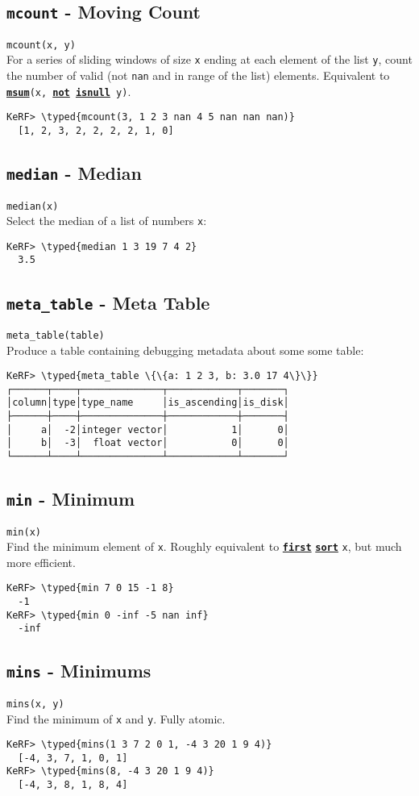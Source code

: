 \documentclass{article}
\newcommand{\typed}[1]{\textcolor{TealBlue}{#1}}
\newcommand{\primdefu}[3]{\subsection{\texttt{#1} - #2}\label{prim:#3}}
\newcommand{\primu}[2]{\hyperref[prim:#2]{\textbf{\texttt{#1}}}}
\newcommand{\primdef}[2]{\primdefu{#1}{#2}{#1}}
\newcommand{\prim}[1]{\primu{#1}{#1}}
\begin{document}
\primdef{mcount}{Moving Count}
\texttt{mcount(x, y)}\\

For a series of sliding windows of size \texttt{x} ending at each element of the list \texttt{y}, count the number of valid (not \texttt{nan} and in range of the list) elements. Equivalent to \texttt{\prim{msum}(x, \prim{not} \prim{isnull} y)}.
\begin{Verbatim}
KeRF> \typed{mcount(3, 1 2 3 nan 4 5 nan nan nan)}
  [1, 2, 3, 2, 2, 2, 2, 1, 0]
\end{Verbatim}

\pagebreak
\primdef{median}{Median}
\texttt{median(x)}\\

Select the median of a list of numbers \texttt{x}:
\begin{Verbatim}
KeRF> \typed{median 1 3 19 7 4 2}
  3.5
\end{Verbatim}

\primdefu{meta\_table}{Meta Table}{metaTable}
\texttt{meta\_table(table)}\\

Produce a table containing debugging metadata about some some table:
\begin{Verbatim}
KeRF> \typed{meta_table \{\{a: 1 2 3, b: 3.0 17 4\}\}}
┌──────┬────┬──────────────┬────────────┬───────┐
│column│type│type_name     │is_ascending│is_disk│
├──────┼────┼──────────────┼────────────┼───────┤
│     a│  -2│integer vector│           1│      0│
│     b│  -3│  float vector│           0│      0│
└──────┴────┴──────────────┴────────────┴───────┘
\end{Verbatim}

\primdef{min}{Minimum}
\texttt{min(x)}\\

Find the minimum element of \texttt{x}. Roughly equivalent to \prim{first} \prim{sort} \texttt{x}, but much more efficient.
\begin{Verbatim}
KeRF> \typed{min 7 0 15 -1 8}
  -1
KeRF> \typed{min 0 -inf -5 nan inf}
  -inf
\end{Verbatim}

\primdef{mins}{Minimums}
\texttt{mins(x, y)}\\

Find the minimum of \texttt{x} and \texttt{y}. Fully atomic.
\begin{Verbatim}
KeRF> \typed{mins(1 3 7 2 0 1, -4 3 20 1 9 4)}
  [-4, 3, 7, 1, 0, 1]
KeRF> \typed{mins(8, -4 3 20 1 9 4)}
  [-4, 3, 8, 1, 8, 4]
\end{Verbatim}
\end{document}
